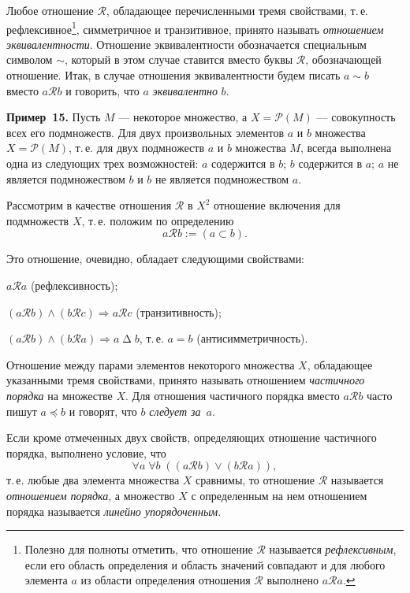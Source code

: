 \medskip

Любое отношение $\mathscr{R}$, обладающее перечисленными тремя свойствами,
т.\,е. рефлексивное\footnote{Полезно для полноты отметить, что отношение $\mathscr{R}$ называется \textit{рефлексивным}, если его
область определения и область значений совпадают и для любого элемента $a$ из области
определения отношения $\mathscr{R}$ выполнено $a \mathrel{\mathscr{R}} a$.}, симметричное и транзитивное, принято называть \textit{отношением эквивалентности}. Отношение эквивалентности обозначается специальным символом $\sim$, который в этом случае ставится вместо буквы $\mathscr{R}$,
обозначающей отношение. Итак, в случае отношения эквивалентности будем писать $a \sim b$ вместо $a \mathrel{\mathscr{R}} b$ и говорить, что $a$ \textit{эквивалентно} $b$.

\textbf{Пример~15.} Пусть $M$ --- некоторое множество, а $X = \mathscr{P}(M)$ --- совокупность всех его подмножеств. Для двух произвольных элементов $a$ и $b$
множества $X = \mathscr{P}(M)$, т.\,е. для двух подмножеств $a$ и $b$ множества $M$, всегда
выполнена одна из следующих трех возможностей: $a$ содержится в $b$; $b$ содержится в $a$; $a$ не является подмножеством $b$ и $b$ не является подмножеством $a$.

Рассмотрим в качестве отношения $\mathscr{R}$ в $X^2$ отношение включения для подмножеств $X$, т.\,е. положим по определению
\[
  a \mathrel{\mathscr{R}} b := (a \subset b).
\]

Это отношение, очевидно, обладает следующими свойствами:

$a \mathrel{\mathscr{R}} a$ (рефлексивность);

$(a \mathrel{\mathscr{R}} b) \land (b \mathrel{\mathscr{R}} c) \Rightarrow a \mathrel{\mathscr{R}} c$ (транзитивность);

$(a \mathrel{\mathscr{R}} b) \land (b \mathrel{\mathscr{R}} a) \Rightarrow a \mathrel{\Delta} b$, т.\,е. $a = b$ (антисимметричность).

\medskip

Отношение между парами элементов некоторого множества $X$, обладающее указанными тремя свойствами, принято называть отношением \textit{частичного порядка} на множестве $X$. Для отношения частичного порядка вместо
$a \mathrel{\mathscr{R}} b$ часто пишут $a \preccurlyeq b$ и говорят, что $b$ \textit{следует за}~$a$.

Если кроме отмеченных двух свойств, определяющих отношение частичного порядка, выполнено условие, что
\[
  \forall a\; \forall b\; ((a \mathrel{\mathscr{R}} b) \lor (b \mathrel{\mathscr{R}} a)),
\]
т.\,е. любые два элемента множества $X$ сравнимы, то отношение $\mathscr{R}$ называется \textit{отношением порядка}, а множество $X$ с определенным на нем отношением
порядка называется \textit{линейно упорядоченным}.

